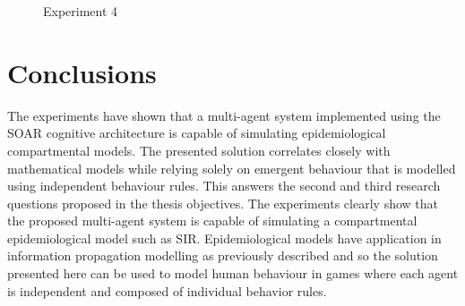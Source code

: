 \begin{figure}[H]
    \centering
    \hspace*{\fill}
    \hspace*{\fill}

    \caption{Experiment 4} \label{fig:experiment3}
\end{figure}

\section{Conclusions}

The experiments have shown that a multi-agent system implemented using the SOAR cognitive architecture is capable of simulating epidemiological compartmental models.
The presented solution correlates closely with mathematical models while relying solely on emergent behaviour that is modelled using independent behaviour rules.
This answers the second and third research questions proposed in the thesis objectives.
The experiments clearly show that the proposed multi-agent system is capable of simulating a compartmental epidemiological model such as SIR.
Epidemiological models have application in information propagation modelling as previously described and so the solution presented here can be used to model human behaviour in games where each agent is independent and composed of individual behavior rules.
